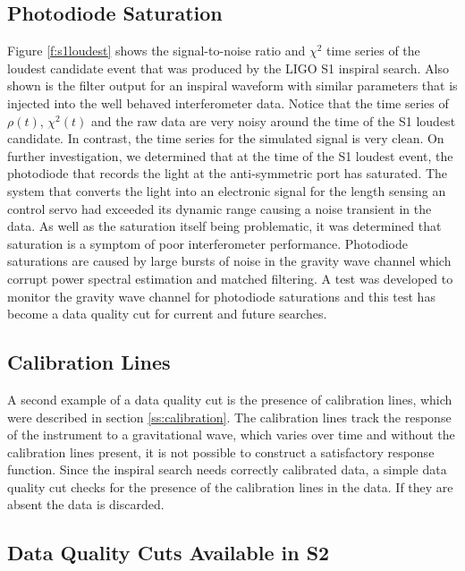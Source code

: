 \subsection{Photodiode Saturation}
\label{ss:photodiode}

Figure \ref{f:s1loudest} shows the signal-to-noise ratio and $\chi^2$ time
series of the loudest candidate event that was produced by the LIGO S1
inspiral search. Also shown is the filter output for an inspiral waveform with
similar parameters that is injected into the well behaved interferometer data.
Notice that the time series of $\rho(t)$, $\chi^2(t)$ and the raw data are
very noisy around the time of the S1 loudest candidate. In contrast, the time
series for the simulated signal is very clean. On further investigation, we
determined that at the time of the S1 loudest event, the photodiode that
records the light at the anti-symmetric port has saturated. The system that
converts the light into an electronic signal for the length sensing an control
servo had exceeded its dynamic range causing a noise transient in the data.
As well as the saturation itself being problematic, it was determined that
saturation is a symptom of poor interferometer performance. Photodiode
saturations are caused by large bursts of noise in the gravity wave channel
which corrupt power spectral estimation and matched filtering. A test was
developed to monitor the gravity wave channel for photodiode saturations and
this test has become a data quality cut for current and future searches.

\subsection{Calibration Lines}
\label{ss:calcut}

A second example of a data quality cut is the presence of calibration lines,
which were described in section \ref{ss:calibration}. The calibration lines
track the response of the instrument to a gravitational wave, which varies
over time and without the calibration lines present, it is not possible to
construct a satisfactory response function. Since the inspiral search needs
correctly calibrated data, a simple data quality cut checks for the presence
of the calibration lines in the data. If they are absent the data is
discarded.

\subsection{Data Quality Cuts Available in S2}
\label{ss:s2dq}

